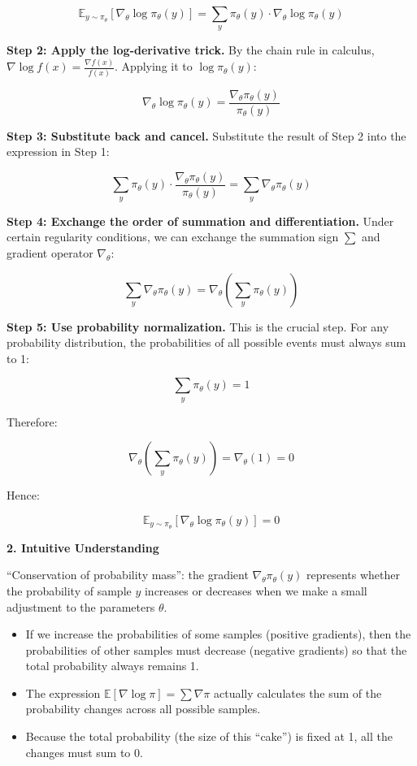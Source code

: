 \[
\mathbb{E}_{y\sim\pi_\theta}\left[\nabla_\theta\log\pi_\theta(y)\right]
=\sum_y \pi_\theta(y)\cdot\nabla_\theta\log\pi_\theta(y)
\]

\textbf{Step 2: Apply the log-derivative trick.} By the chain rule in calculus, \(\nabla\log f(x)=\frac{\nabla f(x)}{f(x)}\). Applying it to \(\log\pi_\theta(y)\):

\[
\nabla_\theta\log\pi_\theta(y)
=\frac{\nabla_\theta\pi_\theta(y)}{\pi_\theta(y)}
\]

\textbf{Step 3: Substitute back and cancel.} Substitute the result of Step 2 into the expression in Step 1:

\[
\sum_y \pi_\theta(y)\cdot
\frac{\nabla_\theta\pi_\theta(y)}{\pi_\theta(y)}
=\sum_y \nabla_\theta\pi_\theta(y)
\]

\textbf{Step 4: Exchange the order of summation and differentiation.} Under certain regularity conditions, we can exchange the summation sign \(\sum\) and gradient operator \(\nabla_\theta\):

\[
\sum_y \nabla_\theta\pi_\theta(y)
=\nabla_\theta\left(\sum_y \pi_\theta(y)\right)
\]

\textbf{Step 5: Use probability normalization.} This is the crucial step. For any probability distribution, the probabilities of all possible events must always sum to 1:

\[
\sum_y \pi_\theta(y)=1
\]

Therefore:

\[
\nabla_\theta\left(\sum_y \pi_\theta(y)\right)
=\nabla_\theta(1)=0
\]

Hence:

\[
\mathbb{E}_{y\sim\pi_\theta}\left[\nabla_\theta\log\pi_\theta(y)\right]=0
\]

\textbf{2. Intuitive Understanding}

``Conservation of probability mass'': the gradient \(\nabla_\theta\pi_\theta(y)\) represents whether the probability of sample \(y\) increases or decreases when we make a small adjustment to the parameters \(\theta\).

\begin{itemize}
\tightlist
\item
  If we increase the probabilities of some samples (positive gradients), then the probabilities of other samples must decrease (negative gradients) so that the total probability always remains 1.
\item
  The expression \(\mathbb{E}[\nabla\log\pi]=\sum\nabla\pi\) actually calculates the sum of the probability changes across all possible samples.
\item
  Because the total probability (the size of this ``cake'') is fixed at 1, all the changes must sum to 0.
\end{itemize}

